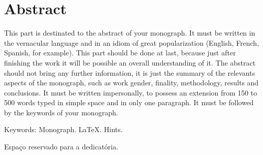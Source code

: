 \documentclass[12pt,a4paper,oneside]{book}
\begin{document}



\chapter*{Abstract}
%
%
\thispagestyle{myheadings}
%
This part is destinated to the abstract of your monograph. 
%
It must be written in the vernacular language and 
in an idiom of great popularization 
(English, French, Spanish, for example). 
%
This part should be done at last, because just after finishing the work 
it will be possible an overall understanding of it. 
%
The abstract should not bring any further information, 
it is just the summary of the relevants aspects of the monograph, 
such as work gender, finality, methodology, results and conclusions. 
%
It must be written impersonally, 
to possess an extension from 150 to 500 words 
typed in simple space and in only one paragraph. 
%
It must be followed by the keywords of your monograph. 

\bigskip

Keywords: Monograph. LaTeX. Hints. 

\newpage




\begin{flushright}
 \begin{minipage}{0.5\textwidth}
  \vspace{17.0cm} 
  Espaço reservado para a dedicatória.
 \end{minipage}
\end{flushright}





\end{document}
